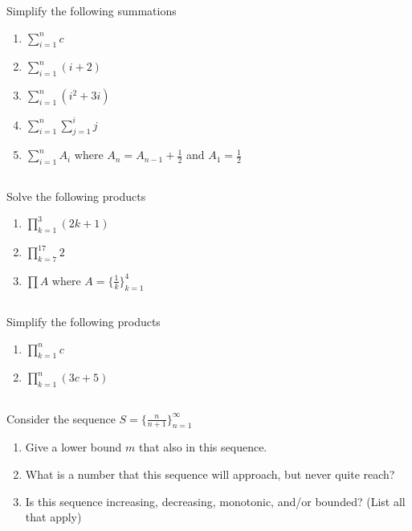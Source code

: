 \documentclass[twocolumn]{article}
\begin{document}
    Simplify the following summations

    \begin{enumerate}
        \item $ \sum_{i=1}^{n} c $
        \item $ \sum_{i=1}^{n} ( i + 2 ) $
        \item $ \sum_{i=1}^{n} ( i^2 + 3i ) $
        \item $ \sum_{i=1}^{n} \sum_{j=1}^{i} j $
        \item $ \sum_{i=1}^{n} A_i $ where $ A_n = A_{n-1} + \frac{1}{2} $ and $ A_1 = \frac{1}{2} $
    \end{enumerate}

\subsection{}

    Solve the following products

    \begin{enumerate}
        \item $ \prod_{k=1}^{3} (2k + 1) $
        \item $ \prod_{k=7}^{17} 2 $
        \item $ \prod A $ where $ A = \{ \frac{1}{k} \}^{4}_{k=1} $
    \end{enumerate}

\subsection{}

    Simplify the following products

    \begin{enumerate}
        \item $ \prod_{k=1}^n c $
        \item $ \prod_{k=1}^n ( 3c + 5) $
    \end{enumerate}

\subsection{}

    Consider the sequence $S = \{ \frac{n}{n+1} \}^\infty_{n=1} $

    \begin{enumerate}
        \item Give a lower bound $m$ that also in this sequence.
        \item What is a number that this sequence will approach, but never quite reach?
        \item Is this sequence increasing, decreasing, monotonic, and/or bounded? (List all that apply)
    \end{enumerate}
\end{document}
